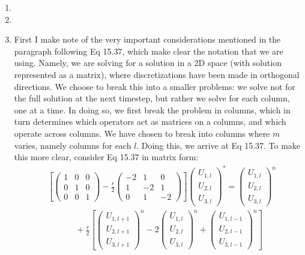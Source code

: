 \documentclass[11pt]{article}
\def\f{\frac }
\begin{document}
\begin{enumerate}
\item

\item

\item First I make note of the very important considerations mentioned in the paragraph following Eq 15.37, which make clear the notation that we are using.
Namely, we are solving for a solution in a 2D space (with solution represented as a matrix), where discretizations have been made in orthogonal directions.
We choose to break this into a smaller problems: we solve not for the full solution at the next timestep, but rather we solve for each column, one at a time.
In doing so, we first break the problem in columns, which in turn determines which operators act as matrices on a columns, and which operate across columns.
We have chosen to break into columns where $m$ varies, namely columns for each $l$.
Doing this, we arrive at Eq 15.37.
To make this more clear, consider Eq 15.37 in matrix form:
\begin{align*} & \left [ \left ( \begin{array}{ccc} 1 & 0 & 0\\ 0 & 1 & 0\\ 0 & 0 & 1 \end{array} \right )  - \f{r}{2} \left ( \begin{array}{ccc} -2 & 1 & 0\\ 1 & -2 & 1\\ 0 & 1 & -2 \end{array} \right )\right ] \left ( \begin{array}{c} U_{1,l} \\ U_{2,l} \\ U_{3,l} \end{array} \right ) ^{*} = \left ( \begin{array}{c} U_{1,l} \\ U_{2,l} \\ U_{3,l} \end{array} \right ) ^{n} \\
&~~~~~~~~~~~~~~~+ \f{r}{2} \left [ \left ( \begin{array}{c} U_{1,l+1} \\ U_{2,l+1} \\ U_{3,l+1} \end{array} \right ) ^{n} - 2\left ( \begin{array}{c} U_{1,l} \\ U_{2,l} \\ U_{3,l} \end{array} \right ) ^{n} + \left ( \begin{array}{c} U_{1,l-1} \\ U_{2,l-1} \\ U_{3,l-1} \end{array} \right ) ^{n}\right ] \end{align*}

\end{enumerate}
\end{document}
